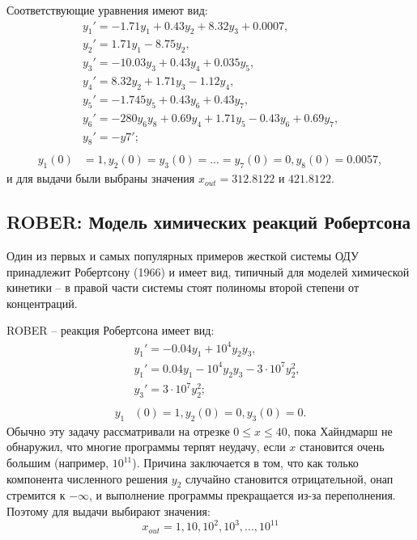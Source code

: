 \documentclass[a4paper,14pt]{extreport}
\begin{document}
   Соответствующие уравнения имеют вид:
    \begin{equation}
	\begin{aligned}
	\label{hires}
	&y_1' = -1.71 y_1+0.43 y_2+8.32 y_3+0.0007,\\
	&y_2' = 1.71y_1 - 8.75y_2,\\
	&y_3' = -10.03y_3+0.43y_4+0.035y_5,\\
	&y_4' = 8.32y_2 + 1.71y_3-1.12y_4,\\
	&y_5' = -1.745y_5 + 0.43y_6 + 0.43y_7,\\
	&y_6' = -280y_6y_8+0.69y_4+1.71y_5-0.43y_6+0.69y_7,\\
	&y_8'=-y7';\\
	&\\
	y_1(0)&=1, y_2(0) = y_3(0) = ...=y_7(0) = 0, y_8(0) = 0.0057,
	\end{aligned}
	\end{equation}
и для выдачи были выбраны значения $x_{out}=312.8122$ и $421.8122$.

\subsection{ROBER: Модель химических реакций Робертсона}
  \label{ss:rober}
  Один из первых и самых популярных примеров жесткой системы ОДУ принадлежит Робертсону (1966) и имеет вид, типичный для моделей химической кинетики -- в правой части системы стоят полиномы второй степени от концентраций.
  
  ROBER -- реакция Робертсона имеет вид:
   \begin{equation}
	\begin{aligned}
	\label{rober}
	&y_1' = -0.04y_1+10^4 y_2y_3,\\
	&y_1' = 0.04y_1-10^4y_2y_3 -3 \cdot 10^7y_2^2,\\
	&y_3' = 3\cdot10^7y_2^2;\\
	\\
	y_1&(0)=1, y_2(0) = 0, y_3(0) = 0.
	\end{aligned}
	\end{equation}
Обычно эту задачу рассматривали на отрезке $0 \leq x \leq 40$, пока Хайндмарш не обнаружил, что многие программы терпят неудачу, если $x$ становится очень большим (например, $10^11$). Причина заключается в том, что как только компонента численного решения $y_2$ случайно становится отрицательной, онап стремится к $-\infty$, и выполнение программы прекращается из-за переполнения. Поэтому для выдачи выбирают значения:
$$ x_{out}=1, 10, 10^2, 10^3, ..., 10^11$$
\end{document}
